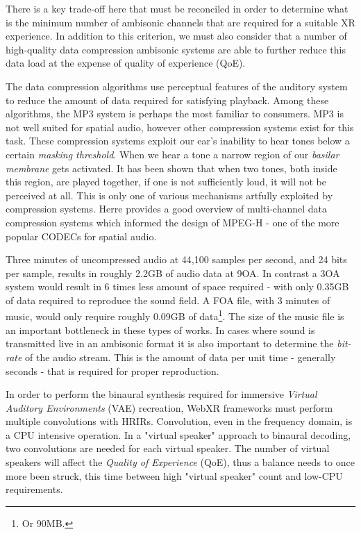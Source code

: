 There is a key trade-off here that must be reconciled in order to determine what is the minimum number of ambisonic channels that are required for a suitable XR experience. In addition to this criterion, we must also consider that a number of high-quality data compression ambisonic systems are able to further reduce this data load at the expense of quality of experience (QoE). 

The data compression algorithms use perceptual features of the auditory system to reduce the amount of data required for satisfying playback. Among these algorithms, the MP3 system is perhaps the most familiar to consumers. MP3 is not well suited for spatial audio, however other compression systems exist for this task. These compression systems exploit our ear's inability to hear tones below a certain \textit{masking threshold}. When we hear a tone a narrow region of our \textit{basilar membrane} gets activated. It has been shown that when two tones, both inside this region, are played together, if one is not sufficiently loud, it will not be perceived at all. This is only one of various mechanisms artfully exploited by compression systems. Herre \cite{herre2015mpeg} provides a good overview of multi-channel data compression systems which informed the design of MPEG-H - one of the more popular CODECs for spatial audio.

Three minutes of uncompressed audio at 44,100 samples per second, and 24 bits per sample, results in roughly 2.2GB of audio data at 9OA. In contrast a 3OA system would result in 6 times less amount of space required - with only 0.35GB of data required to reproduce the sound field. A FOA file, with 3 minutes of music, would only require roughly 0.09GB of data\footnote{Or 90MB.}. The size of the music file is an important bottleneck in these types of works. In cases where sound is transmitted live in an ambisonic format it is also important to determine the \textit{bit-rate} of the audio stream. This is the amount of data per unit time - generally seconds - that is required for proper reproduction. 

In order to perform the binaural synthesis required for immersive \textit{Virtual Auditory Environments} (VAE) recreation, WebXR frameworks must perform multiple convolutions with HRIRs. Convolution, even in the frequency domain, is a CPU intensive operation. In a "virtual speaker" approach to binaural decoding, two convolutions are needed for each virtual speaker. The number of virtual speakers will affect the \textit{Quality of Experience} (QoE), thus a balance needs to once more been struck, this time between high "virtual speaker" count and low-CPU requirements. 


